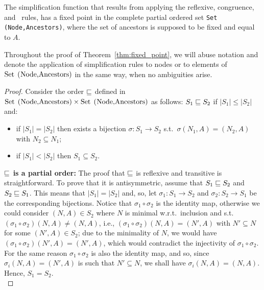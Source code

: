 \begin{theorem}
\label{thm:fixed_point}
	The simplification function that results from applying the reflexive,
	congruence, and \BPA\ rules, has a fixed point in the complete partial
	ordered set \lstinline{Set (Node,Ancestors)}, where the set of ancestors
	is supposed to be fixed and equal to $A$.
\end{theorem}

Throughout the proof of Theorem~\ref{thm:fixed_point}, we will abuse 
notation and denote the application of simplification rules
to nodes or to elements of $\text{\lstinline{Set (Node,Ancestors)}}$
in the same way, when no ambiguities arise.

\begin{proof}
	Consider the order 
	$\sqsubseteq$ defined in $\text{\lstinline{Set (Node,Ancestors)}}
	\times \text{\lstinline{Set (Node,Ancestors)}}$ as follows:
	$S_1 \sqsubseteq S_2$ if $|S_1| \leq |S_2|$ and:
	\begin{itemize}
		\item if $|S_1|=|S_2|$ then exists a bijection 
			$\sigma : S_1 \rightarrow S_2$ s.t.\  
			$\sigma(N_1,A) = (N_2,A)$ with $N_2\subseteq N_1$;
		\item if $|S_1| < |S_2|$ then $S_1\subseteq S_2$.
	\end{itemize}
	
	\noindent\textbf{$\sqsubseteq$ is a partial order:} The proof that
	$\sqsubseteq$ is reflexive and transitive is straightforward. 
	To prove that it is 
	antisymmetric, assume that $S_1\sqsubseteq S_2$ and $S_2 \sqsubseteq S_1$.
	This means that $|S_1|=|S_2|$ and, so, let 
	$\sigma_1 : S_1 \rightarrow S_2$ and $\sigma_2 : S_2 \rightarrow S_1$
	be the corresponding bijections. Notice that $\sigma_1\circ \sigma_2$  
	is the identity map, otherwise we could consider $(N,A)\in S_2$
	where $N$ is minimal w.r.t.\ inclusion and s.t.\
	$(\sigma_1\circ \sigma_2)(N,A) \neq (N,A)$, i.e.,
	$(\sigma_1\circ \sigma_2)(N,A) = (N',A)$ with $N'\subseteq N$ 
	for some $(N',A)\in S_2$;
	due to the minimality of $N$, we would have 
	$(\sigma_1\circ \sigma_2)(N',A) = (N',A)$, which would contradict the
	injectivity of $\sigma_1\circ \sigma_2$. For the same reason 
	$\sigma_1\circ \sigma_2$ is also the identity map, and so, since
	$\sigma_i (N,A) = (N',A)$ is such that $N'\subseteq N$, we shall 
	have $\sigma_i (N,A) = (N,A)$. Hence, $S_1=S_2$.\\
	

\end{proof}
